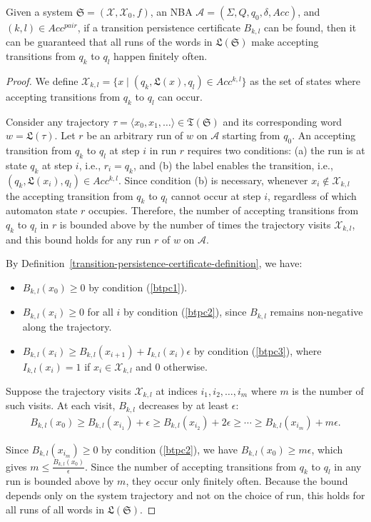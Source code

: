 \begin{lemma}
  Given a system $\mathfrak{S}=(\mathcal{X}, \mathcal{X}_0, f)$, an NBA $\mathcal{A} = (\Sigma, Q, q_0, \delta, Acc)$, and $(k, l) \in Acc^{pair}$, if a transition persistence certificate $B_{k, l}$ can be found, then it can be guaranteed that all runs of the words in $\mathfrak{L}(\mathfrak{S})$ make accepting transitions from $q_k$ to $q_l$ happen finitely often.
\end{lemma}

\begin{proof}
We define $\mathcal{X}_{k, l}=\{x \mid (q_k, \mathfrak{L}(x), q_l) \in Acc^{k,l}\}$ as the set of states where accepting transitions from $q_k$ to $q_l$ can occur.

Consider any trajectory $\tau = \langle x_0, x_1, \dots \rangle \in \mathfrak{T}(\mathfrak{S})$ and its corresponding word $w = \mathfrak{L}(\tau)$. Let $r$ be an arbitrary run of $w$ on $\mathcal{A}$ starting from $q_0$. An accepting transition from $q_k$ to $q_l$ at step $i$ in run $r$ requires two conditions: (a) the run is at state $q_k$ at step $i$, i.e., $r_i = q_k$, and (b) the label enables the transition, i.e., $(q_k, \mathfrak{L}(x_i), q_l) \in Acc^{k,l}$. Since condition (b) is necessary, whenever $x_i \notin \mathcal{X}_{k,l}$ the accepting transition from $q_k$ to $q_l$ cannot occur at step $i$, regardless of which automaton state $r$ occupies. Therefore, the number of accepting transitions from $q_k$ to $q_l$ in $r$ is bounded above by the number of times the trajectory visits $\mathcal{X}_{k,l}$, and this bound holds for any run $r$ of $w$ on $\mathcal{A}$.

By Definition~\ref{transition-persistence-certificate-definition}, we have:
\begin{itemize}
  \item $B_{k,l}(x_0) \geq 0$ by condition (\ref{btpc1}).
  \item $B_{k,l}(x_i) \geq 0$ for all $i$ by condition (\ref{btpc2}), since $B_{k,l}$ remains non-negative along the trajectory.
  \item $B_{k,l}(x_i) \geq B_{k,l}(x_{i+1}) + I_{k,l}(x_i)\epsilon$ by condition (\ref{btpc3}), where $I_{k,l}(x_i) = 1$ if $x_i \in \mathcal{X}_{k,l}$ and $0$ otherwise.
\end{itemize}

Suppose the trajectory visits $\mathcal{X}_{k,l}$ at indices $i_1, i_2, \dots, i_m$ where $m$ is the number of such visits. At each visit, $B_{k,l}$ decreases by at least $\epsilon$:
\begin{align}
B_{k,l}(x_0) \geq B_{k,l}(x_{i_1}) + \epsilon \geq B_{k,l}(x_{i_2}) + 2\epsilon \geq \cdots \geq B_{k,l}(x_{i_m}) + m\epsilon.
\end{align}

Since $B_{k,l}(x_{i_m}) \geq 0$ by condition (\ref{btpc2}), we have $B_{k,l}(x_0) \geq m\epsilon$, which gives $m \leq \frac{B_{k,l}(x_0)}{\epsilon}$. Since the number of accepting transitions from $q_k$ to $q_l$ in any run is bounded above by $m$, they occur only finitely often. Because the bound depends only on the system trajectory and not on the choice of run, this holds for all runs of all words in $\mathfrak{L}(\mathfrak{S})$.
\end{proof}


